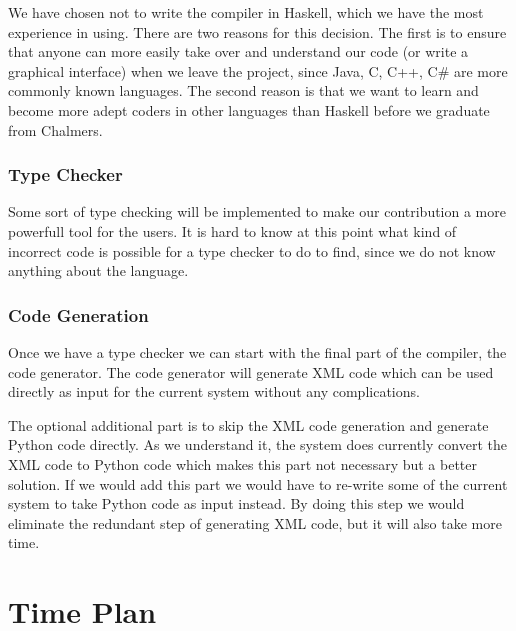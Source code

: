 \documentclass[a4paper]{article}
\begin{document}
We have chosen not to write the compiler in Haskell, which we have the
most experience in using. There are two reasons for this decision. The
first is to ensure that anyone can more easily take over and
understand our code (or write a graphical interface) when we leave the
project, since Java, C, C++, C# are more commonly known languages. The
second reason is that we want to learn and become more adept coders in
other languages than Haskell before we graduate from Chalmers.

\subsubsection{Type Checker}
Some sort of type checking will be implemented to make our
contribution a more powerfull tool for the users. It is hard to know
at this point what kind of incorrect code is possible for a type
checker to do to find, since we do not know anything about the
language.

\subsubsection{Code Generation}
Once we have a type checker we can start with the final part of the
compiler, the code generator. The code generator will generate XML
code which can be used directly as input for the current system
without any complications.

The optional additional part is to skip the XML code generation and
generate Python code directly. As we understand it, the system does
currently convert the XML code to Python code which makes this part
not necessary but a better solution. If we would add this part we
would have to re-write some of the current system to take Python code
as input instead. By doing this step we would eliminate the redundant
step of generating XML code, but it will also take more time.


\section{Time Plan}
\end{document}
